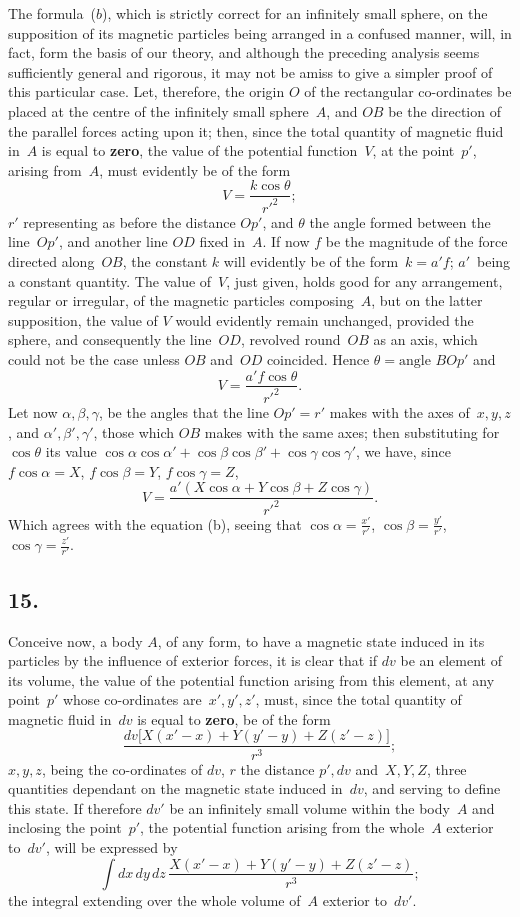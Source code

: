 \documentclass[11pt,notitlepage]{amsart}
\let\Emphasis\textbf
\newcommand\Section[1]{\subsection{{#1}}}
\begin{document}
The formula~($b$), which is strictly correct for an infinitely small sphere,
on the supposition of its magnetic particles being arranged in a confused
manner, will, in fact, form the basis of our theory, and although the preceding
analysis seems sufficiently general and rigorous, it may not be amiss to
give a simpler proof of this particular case. Let, therefore, the origin $O$ of
the rectangular co-ordinates be placed at the centre of the infinitely small
sphere~$A$, and $OB$ be the direction of the parallel forces acting upon it;
then,
since the total quantity of magnetic fluid in~$A$ is equal to \Emphasis{zero},
the value of
the potential function~$V$, at the point~$p'$, arising from~$A$,
must evidently be
of the form
\[
V=\frac{k\cos\theta}{r'^2};
\]
$r'$ representing as before the distance $Op'$,
and $\theta$ the angle formed between
the line~$Op'$, and another line $OD$ fixed in~$A$. If now $f$ be the magnitude
of the force directed along~$OB$, the constant $k$ will evidently be of the
form~${k=a'f}$;
$a'$~being a constant quantity. The value of~$V$, just given, holds
good for any arrangement, regular or irregular, of the magnetic particles
composing~$A$, but on the latter supposition, the value of $V$ would evidently
remain unchanged, provided the sphere, and consequently the line~$OD$, revolved
round~$OB$ as an axis, which could not be the case unless $OB$ and~$OD$
coincided. Hence ${\theta=\text{angle $BOp'$}}$ and
\[
V=\frac{a'f\cos\theta}{r'^2}.
\]
Let now $\alpha,\beta,\gamma$, be the angles that the line $Op'=r'$
makes with the axes
of~$x,y,z$, and $\alpha',\beta',\gamma'$,
those which $OB$ makes with the same axes; then
substituting for $\cos\theta$ its value
$\cos\alpha\cos\alpha'+\cos\beta\cos\beta'+\cos\gamma\cos\gamma'$, we have,
since $f\cos\alpha=X$, $f\cos\beta=Y$, $f\cos\gamma=Z$,
\[
\tag{$b$.}
V=\frac{a'(X\cos\alpha+Y\cos\beta+Z\cos\gamma)}{r'^2}.
\]
Which agrees with the equation (b), seeing that $\cos\alpha=\frac{x'}{r'}$, 
$\cos\beta=\frac{y'}{r'}$, $\cos\gamma=\frac{z'}{r'}$.
\bigskip

\Section{15.}
Conceive now, a body $A$, of any form, to have a magnetic state induced
in its particles by the influence of exterior forces, it is clear that if
$dv$ be an element of its volume, the value of the potential function arising
from this element, at any point~$p'$ whose co-ordinates are~$x',y',z'$, must,
since the total quantity of magnetic fluid in~$dv$ is equal to \Emphasis{zero},
be of the form
\[
\tag{$a$.}
\frac{dv\bigl[X(x'-x)+Y(y'-y)+Z(z'-z)\bigr]}{r^3};
\]
$x,y,z$, being the co-ordinates of $dv$, $r$ the distance $p',dv$ and~$X,Y,Z$,
three quantities dependant on the magnetic state induced in~$dv$, and serving
to define this state. If therefore $dv'$
be an infinitely small volume within the
body~$A$ and inclosing the point~$p'$,
the potential function arising from the whole~$A$
exterior to~$dv'$, will be expressed by
\[
\int dx\,dy\,dz\,
\frac{X(x'-x)+Y(y'-y)+Z(z'-z)}{r^3};
\]
the integral extending over the whole volume of~$A$ exterior to~$dv'$.
\end{document}

